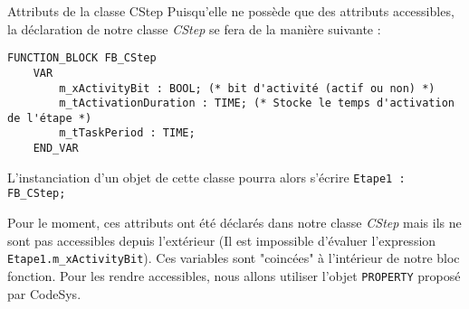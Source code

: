 \begin{UPSTIidee}{Attributs de la classe CStep}
    Puisqu'elle ne possède que des attributs accessibles, la déclaration de notre classe \emph{CStep} se fera de la manière suivante :
    \begin{lstlisting}
FUNCTION_BLOCK FB_CStep
    VAR
        m_xActivityBit : BOOL; (* bit d'activité (actif ou non) *)
        m_tActivationDuration : TIME; (* Stocke le temps d'activation de l'étape *)
        m_tTaskPeriod : TIME; 
    END_VAR\end{lstlisting}

    L'instanciation d'un objet de cette classe pourra alors s'écrire \lstinline{Etape1 : FB_CStep;}

    Pour le moment, ces attributs ont été déclarés dans notre classe \emph{CStep} mais ils ne sont pas accessibles depuis l'extérieur (Il est impossible d'évaluer l'expression \lstinline{Etape1.m_xActivityBit}). Ces variables sont "coincées" à l'intérieur de notre bloc fonction. Pour les rendre accessibles, nous allons utiliser l'objet \lstinline{PROPERTY} proposé par CodeSys. 
\end{UPSTIidee}